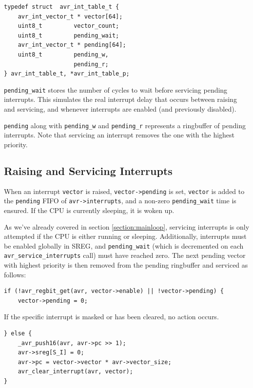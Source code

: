 \begin{lstlisting}
typedef struct  avr_int_table_t {
    avr_int_vector_t * vector[64];
    uint8_t         vector_count;
    uint8_t         pending_wait;
    avr_int_vector_t * pending[64];
    uint8_t         pending_w,
                    pending_r;
} avr_int_table_t, *avr_int_table_p;
\end{lstlisting}

\lstinline|pending_wait| stores the number of cycles to wait before servicing
pending interrupts. This simulates the real interrupt delay that occurs between
raising and servicing, and whenever interrupts are enabled
(and previously disabled).

\lstinline|pending| along with \lstinline|pending_w| and \lstinline|pending_r|
represents a ringbuffer of pending interrupts. Note that servicing an
interrupt removes the one with the highest priority.


\subsection{Raising and Servicing Interrupts}

When an interrupt \lstinline|vector| is raised, \lstinline|vector->pending| is
set, \lstinline|vector| is added to the \lstinline|pending| \ac{FIFO} of
\lstinline|avr->interrupts|, and a non-zero \lstinline|pending_wait| time is
ensured. If the \ac{CPU} is currently sleeping, it is woken up.

As we've already covered in section \ref{section:mainloop}, servicing interrupts is
only attempted if the \ac{CPU} is either running or sleeping. Additionally,
interrupts must be enabled globally in \ac{SREG}, and \lstinline|pending_wait|
(which is decremented on each \lstinline|avr_service_interrupts| call) must have
reached zero. The next pending vector with highest priority is then removed from
the pending ringbuffer and serviced as follows:

\begin{lstlisting}
if (!avr_regbit_get(avr, vector->enable) || !vector->pending) {
    vector->pending = 0;
\end{lstlisting}

If the specific interrupt is masked or has been cleared, no action occurs.

\begin{lstlisting}
} else {
    _avr_push16(avr, avr->pc >> 1);
    avr->sreg[S_I] = 0;
    avr->pc = vector->vector * avr->vector_size;
    avr_clear_interrupt(avr, vector);
}
\end{lstlisting}

